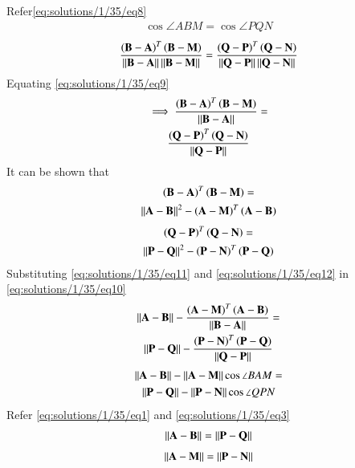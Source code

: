 Refer\eqref{eq:solutions/1/35/eq8}\\
\begin{align}
\cos \angle ABM=\cos \angle PQN    
\end{align}
\begin{align}
\frac{\left( \mathbf{ B - A} \right)^T  \left( \mathbf{B - M } \right)}{\left\lVert\mathbf{ B - A}\right\rVert \left\lVert\mathbf{B - M}\right\rVert}=\frac{\left( \mathbf{ Q - P} \right)^T  \left( \mathbf{Q - N} \right)}{\left\lVert\mathbf{ Q - P}\right\rVert \left\lVert\mathbf{Q - N}\right\rVert}
\end{align}
Equating \eqref{eq:solutions/1/35/eq9}
\begin{multline}
\label{eq:solutions/1/35/eq10} 
\implies\frac{\left( \mathbf{ B - A} \right)^T  \left( \mathbf{B - M} \right)}{\left\lVert\mathbf{ B - A}\right\rVert}=\\
\frac{\left( \mathbf{ Q - P} \right)^T  \left( \mathbf{Q - N } \right)}{\left\lVert\mathbf{ Q - P}\right\rVert}
\end{multline}
It can be shown that
\begin{multline}
\label{eq:solutions/1/35/eq11}
 \left( \mathbf{ B - A} \right)^T  \left( \mathbf{B - M} \right)=\\
 \left\lVert\mathbf{A - B}\right\rVert^2 - \left ( \mathbf{  A - M  }\right)^T \left( \mathbf{A - B} \right)
 \end{multline}
 \begin{multline}
 \label{eq:solutions/1/35/eq12}
 \left( \mathbf{ Q - P} \right)^T  \left( \mathbf{ Q- N } \right)=\\
 \left\lVert\mathbf{P - Q}\right\rVert^2 - \left ( \mathbf{  P - N  }\right)^T \left( \mathbf{P - Q} \right)
\end{multline}
Substituting \eqref{eq:solutions/1/35/eq11} and \eqref{eq:solutions/1/35/eq12} in \eqref{eq:solutions/1/35/eq10}
\begin{multline}
\left\lVert\mathbf{A - B}\right\rVert- \frac{\left( \mathbf{ A - M} \right)^T \left( \mathbf{A - B} \right)}{\left\lVert\mathbf{ B - A}\right\rVert} =\\ \left\lVert\mathbf{P - Q}\right\rVert- \frac{\left( \mathbf{ P - N} \right)^T \left( \mathbf{P- Q} \right)}{\left\lVert\mathbf{ Q - P}\right\rVert}
\end{multline}
\begin{multline}
\left\lVert\mathbf{A - B}\right\rVert- \left\lVert\mathbf{A - M}\right\rVert\cos\angle BAM =\\  \left\lVert\mathbf{P - Q}\right\rVert- \left\lVert\mathbf{P - N}\right\rVert\cos\angle QPN   
\end{multline}
 Refer \eqref{eq:solutions/1/35/eq1} and \eqref{eq:solutions/1/35/eq3}
\begin{align}
\left\lVert\mathbf{A - B}\right\rVert= \left\lVert\mathbf{P - Q}\right\rVert
\end{align}
\begin{align}
\left\lVert\mathbf{A - M}\right\rVert= \left\lVert\mathbf{P - N}\right\rVert
\end{align}
